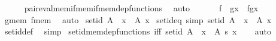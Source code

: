 \begin{isabellebody}
\ \ \ \ \isamarkupfalse%
\ pair{\isacharunderscore}{\kern0pt}eval{\isacharunderscore}{\kern0pt}mem{\isacharunderscore}{\kern0pt}if{\isacharunderscore}{\kern0pt}mem{\isacharunderscore}{\kern0pt}if{\isacharunderscore}{\kern0pt}mem{\isacharunderscore}{\kern0pt}dep{\isacharunderscore}{\kern0pt}functions\ \isamarkupfalse%
\ auto\isanewline
\ \ \ \isamarkupfalse%
\ \isamarkupfalse%
\ {\isachardoublequoteopen}{\isacharparenleft}{\kern0pt}f\ {\isasymcirc}\ g{\isacharparenright}{\kern0pt}{\isacharbackquote}{\kern0pt}x\ {\isacharequal}{\kern0pt}\ f{\isacharbackquote}{\kern0pt}{\isacharparenleft}{\kern0pt}g{\isacharbackquote}{\kern0pt}x{\isacharparenright}{\kern0pt}{\isachardoublequoteclose}\ \isamarkupfalse%
\ g{\isacharunderscore}{\kern0pt}mem\ f{\isacharunderscore}{\kern0pt}mem\ \isamarkupfalse%
\ auto\isanewline
{}\isamarkupfalse%
%
\endisatagproof
{\isafoldproof}%
%
\isadelimproof
\isanewline
%
\endisadelimproof
\isanewline
{}\isamarkupfalse%
\ {\isachardoublequoteopen}set{\isacharunderscore}{\kern0pt}id\ A\ {\isasymequiv}\ {\isasymlambda}x\ {\isasymin}\ A{\isachardot}{\kern0pt}\ x{\isachardoublequoteclose}\isanewline
\isanewline
{}\isamarkupfalse%
\ set{\isacharunderscore}{\kern0pt}id{\isacharunderscore}{\kern0pt}eq\ {\isacharbrackleft}{\kern0pt}simp{\isacharbrackright}{\kern0pt}{\isacharcolon}{\kern0pt}\ {\isachardoublequoteopen}set{\isacharunderscore}{\kern0pt}id\ A\ {\isacharequal}{\kern0pt}\ {\isasymlambda}x\ {\isasymin}\ A{\isachardot}{\kern0pt}\ x{\isachardoublequoteclose}\isanewline
%
\isadelimproof
\ \ %
\endisadelimproof
%
\isatagproof
{}\isamarkupfalse%
\ set{\isacharunderscore}{\kern0pt}id{\isacharunderscore}{\kern0pt}def\ \isamarkupfalse%
\ simp%
\endisatagproof
{\isafoldproof}%
%
\isadelimproof
\isanewline
%
\endisadelimproof
\isanewline
{}\isamarkupfalse%
\ set{\isacharunderscore}{\kern0pt}id{\isacharunderscore}{\kern0pt}mem{\isacharunderscore}{\kern0pt}dep{\isacharunderscore}{\kern0pt}functions\ {\isacharbrackleft}{\kern0pt}iff{\isacharbrackright}{\kern0pt}{\isacharcolon}{\kern0pt}\ {\isachardoublequoteopen}set{\isacharunderscore}{\kern0pt}id\ A\ {\isasymin}\ {\isacharparenleft}{\kern0pt}x\ {\isasymin}\ A{\isacharparenright}{\kern0pt}\ {\isasymrightarrow}s\ {\isacharbraceleft}{\kern0pt}x{\isacharbraceright}{\kern0pt}{\isachardoublequoteclose}\isanewline
%
\isadelimproof
\ \ %
\endisadelimproof
%
\isatagproof
{}\isamarkupfalse%
\ auto%

\end{isabellebody}

